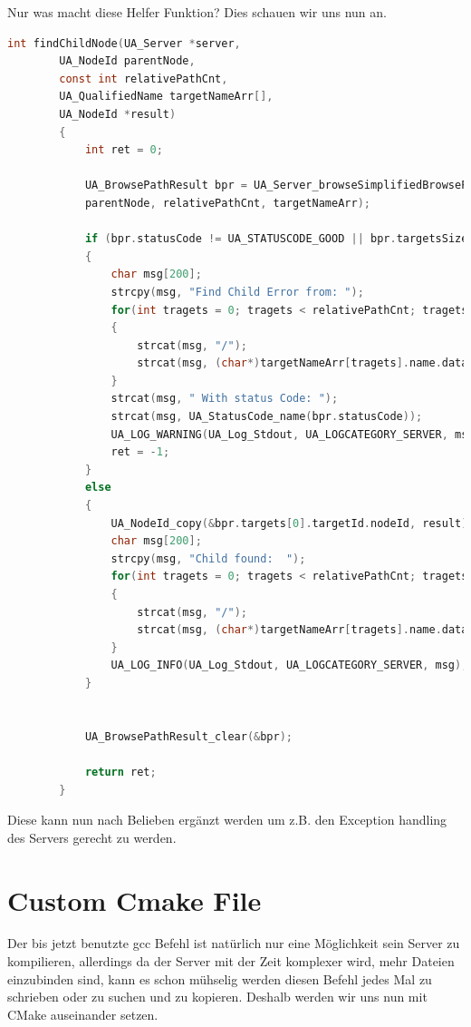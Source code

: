 	Nur was macht diese Helfer Funktion?
	Dies schauen wir uns nun an.
	\begin{lstlisting}[language=C]
		int findChildNode(UA_Server *server, 
		UA_NodeId parentNode, 
		const int relativePathCnt, 
		UA_QualifiedName targetNameArr[], 
		UA_NodeId *result) 
		{
			int ret = 0;
			
			UA_BrowsePathResult bpr = UA_Server_browseSimplifiedBrowsePath(server, 
			parentNode, relativePathCnt, targetNameArr);
			
			if (bpr.statusCode != UA_STATUSCODE_GOOD || bpr.targetsSize < 1)
			{
				char msg[200];
				strcpy(msg, "Find Child Error from: ");
				for(int tragets = 0; tragets < relativePathCnt; tragets++)
				{
					strcat(msg, "/");
					strcat(msg, (char*)targetNameArr[tragets].name.data);
				}
				strcat(msg, " With status Code: "); 
				strcat(msg, UA_StatusCode_name(bpr.statusCode));
				UA_LOG_WARNING(UA_Log_Stdout, UA_LOGCATEGORY_SERVER, msg);
				ret = -1;
			}
			else
			{
				UA_NodeId_copy(&bpr.targets[0].targetId.nodeId, result);
				char msg[200];
				strcpy(msg, "Child found:  ");
				for(int tragets = 0; tragets < relativePathCnt; tragets++)
				{
					strcat(msg, "/");
					strcat(msg, (char*)targetNameArr[tragets].name.data);
				}
				UA_LOG_INFO(UA_Log_Stdout, UA_LOGCATEGORY_SERVER, msg);
			}
			
			
			UA_BrowsePathResult_clear(&bpr);
			
			return ret;
		}
	\end{lstlisting}
	Diese kann nun nach Belieben ergänzt werden um z.B. den Exception handling des Servers gerecht zu werden.
\clearpage
	\section{Custom Cmake File}
	Der bis jetzt benutzte gcc Befehl ist natürlich nur eine Möglichkeit sein Server zu kompilieren, allerdings da der Server mit der Zeit komplexer wird, mehr Dateien einzubinden sind, kann es schon mühselig werden diesen Befehl jedes Mal zu schrieben oder zu suchen und zu kopieren.
	Deshalb werden wir uns nun mit CMake auseinander setzen.
	
